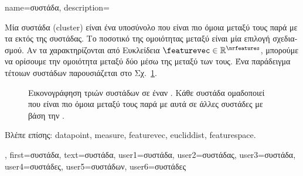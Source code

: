 {name={\foreignlanguage{greek}{συστάδα}}, 
	description={\foreignlanguage{greek}{Μία συστάδα} (cluster) \foreignlanguage{greek}{είναι ένα υποσύνολο}
		 \foreignlanguage{greek}{που είναι πιο όμοια μεταξύ τους παρά με τα}  
		\foreignlanguage{greek}{εκτός της συστάδας. Το ποσοτικό}  \foreignlanguage{greek}{της ομοιότητας μεταξύ} 
		 \foreignlanguage{greek}{είναι μία επιλογή σχεδιασμού. Αν τα}  
		\foreignlanguage{greek}{χαρακτηρίζονται από Ευκλείδεια}  $\featurevec \in \mathbb{R}^{\nrfeatures}$, 
		\foreignlanguage{greek}{μπορούμε να ορίσουμε την ομοιότητα μεταξύ δύο}  \foreignlanguage{greek}{μέσω της} 
		 \foreignlanguage{greek}{μεταξύ των}  \foreignlanguage{greek}{τους. Ένα παράδειγμα 
		τέτοιων συστάδων παρουσιάζεται στο Σχ.}\ \ref{fig:clusters_dict}.
		\begin{figure}[H]
		\centering
		{
		\caption{\foreignlanguage{greek}{Εικονογράφηση τριών συστάδων σε έναν}  . 
			\foreignlanguage{greek}{Κάθε συστάδα ομαδοποιεί}  \foreignlanguage{greek}{που είναι πιο όμοια μεταξύ τους 
			παρά με αυτά σε άλλες συστάδες με βάση την} . }
			\label{fig:clusters_dict} }
		\end{figure}
		\foreignlanguage{greek}{Βλέπε επίσης:} \gls{datapoint}, \gls{measure}, \gls{featurevec}, \gls{eucliddist}, \gls{featurespace}.},
	first={\foreignlanguage{greek}{συστάδα}},
	text={\foreignlanguage{greek}{συστάδα}},
	user1={\foreignlanguage{greek}{συστάδα}}, %
	user2={\foreignlanguage{greek}{συστάδας}}, %
	user3={\foreignlanguage{greek}{συστάδα}}, %
	user4={\foreignlanguage{greek}{συστάδες}}, %
	user5={\foreignlanguage{greek}{συστάδων}}, %
	user6={\foreignlanguage{greek}{συστάδες}} %
}

